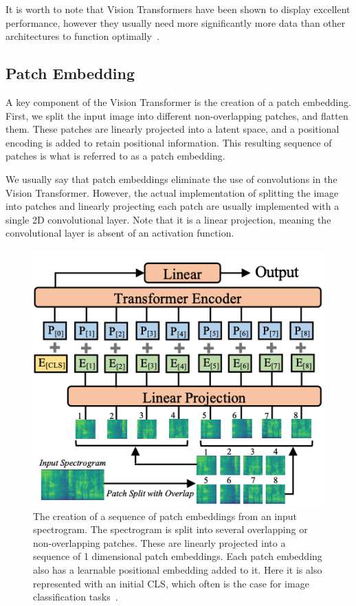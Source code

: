 It is worth to note that Vision Transformers have been shown to display excellent performance, however they usually need more significantly more data than other architectures to function optimally~\cite{dosovitskiy2021imageworth16x16words}.

\subsection{Patch Embedding}

A key component of the Vision Transformer is the creation of a patch embedding. First, we split the input image into different non-overlapping patches, and flatten them. These patches are linearly projected into a latent space, and a positional encoding is added to retain positional information. This resulting sequence of patches is what is referred to as a patch embedding.

We usually say that patch embeddings eliminate the use of convolutions in the Vision Transformer. However, the actual implementation of splitting the image into patches and linearly projecting each patch are usually implemented with a single 2D convolutional layer. Note that it is a linear projection, meaning the convolutional layer is absent of an activation function.

\begin{figure}[H]
    \centering
    \includegraphics[trim=0 0 0 116, clip, scale=0.7]{figures/patchembedding.png}
    \caption{The creation of a sequence of patch embeddings from an input spectrogram. The spectrogram is split into several overlapping or non-overlapping patches. These are linearly projected into a sequence of 1 dimensional patch embeddings. Each patch embedding also has a learnable positional embedding added to it. Here it is also represented with an initial \acrfull{CLS}, which often is the case for image classification tasks~\cite{gong2021astaudiospectrogramtransformer}.}
    \label{PatchEmbeddingFigure}
\end{figure}

